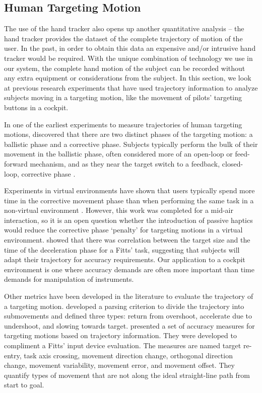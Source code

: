 \subsection{Human Targeting Motion}
\label{human-targeting-motion}

The use of the hand tracker also opens up another quantitative analysis -- the hand tracker provides the dataset of the complete trajectory of motion of the user.
In the past, in order to obtain this data an expensive and/or intrusive hand tracker would be required.
With the unique combination of technology we use in our system, the complete hand motion of the subject can be recorded without any extra equipment or considerations from the subject.
In this section, we look at previous research experiments that have used trajectory information to analyze subjects moving in a targeting motion, like the movement of pilots' targeting buttons in a cockpit.

In one of the earliest experiments to measure trajectories of human targeting motions, \citet{woodworth_accuracy_1899} discovered that there are two distinct phases of the targeting motion: a ballistic phase and a corrective phase.
Subjects typically perform the bulk of their movement in the ballistic phase, often considered more of an open-loop or feed-forward mechanism, and as they near the target switch to a feedback, closed-loop, corrective phase \citep{elliott_control_1999}.

Experiments in virtual environments have shown that users typically spend more time in the corrective movement phase than when performing the same task in a non-virtual environment \citep{liu_comparing_2009}.
However, this work was completed for a mid-air interaction, so it is an open question whether the introduction of passive haptics would reduce the corrective phase `penalty' for targeting motions in a virtual environment.
\citet{mackenzie_three-dimensional_1987} showed that there was correlation between the target size and the time of the deceleration phase for a Fitts' task, suggesting that subjects will adapt their trajectory for accuracy requirements.
Our application to a cockpit environment is one where accuracy demands are often more important than time demands for manipulation of instruments.

Other metrics have been developed in the literature to evaluate the trajectory of a targeting motion.
\citet{meyer_optimality_1988} developed a parsing criterion to divide the trajectory into submovements and defined three types: return from overshoot, accelerate due to undershoot, and slowing towards target.
\citet{mackenzie_accuracy_2001} presented a set of accuracy measures for targeting motions based on trajectory information.
They were developed to compliment a Fitts' input device evaluation.
The measures are named target re-entry, task axis crossing, movement direction change, orthogonal direction change, movement variability, movement error, and movement offset.
They quantify types of movement that are not along the ideal straight-line path from start to goal.

